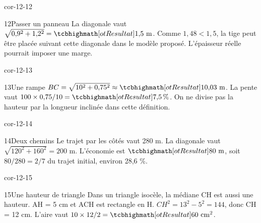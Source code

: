 \begin{blocLivre}{cor-12-12}\begin{corrige}{12}{Passer un panneau}
La diagonale vaut $\sqrt{0{,}9^2+1{,}2^2}=\res{1{,}5\text{ m}}$. Comme $1{,}48<1{,}5$, la tige peut être placée suivant cette diagonale dans le modèle proposé. L’épaisseur réelle pourrait imposer une marge.
\label{fig-cor-12-12}
\end{corrige}\end{blocLivre}
\begin{blocLivre}{cor-12-13}\begin{corrige}{13}{Une rampe}
$BC=\sqrt{10^2+0{,}75^2}\approx\res{10{,}03\text{ m}}$. La pente vaut $100\times0{,}75/10=\res{7{,}5\,\%}$. On ne divise pas la hauteur par la longueur inclinée dans cette définition.
\label{fig-cor-12-13}
\end{corrige}\end{blocLivre}
\begin{blocLivre}{cor-12-14}\begin{corrige}{14}{Deux chemins}
Le trajet par les côtés vaut 280 m. La diagonale vaut $\sqrt{120^2+160^2}=200$ m. L’économie est $\res{80\text{ m}}$, soit $80/280=2/7$ du trajet initial, environ 28,6 \%.
\label{fig-cor-12-14}
\end{corrige}\end{blocLivre}
\begin{blocLivre}{cor-12-15}\begin{corrige}{15}{Une hauteur de triangle}
Dans un triangle isocèle, la médiane CH est aussi une hauteur. AH = 5 cm et ACH est rectangle en H. $CH^2=13^2-5^2=144$, donc CH = 12 cm. L’aire vaut $10\times12/2=\res{60\text{ cm}^2}$.
\label{fig-cor-12-15}
\end{corrige}\end{blocLivre}
